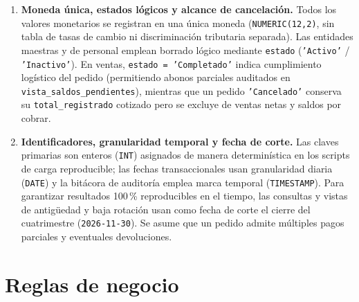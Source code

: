 \documentclass[11pt,oneside]{article}
\begin{document}
\begin{enumerate}[leftmargin=1.5em, itemsep=4pt]
  \item \textbf{Moneda \'unica, estados l\'ogicos y alcance de cancelaci\'on.}
        Todos los valores monetarios se registran en una \'unica moneda
        (\texttt{NUMERIC(12,2)}, sin tabla de tasas de cambio ni discriminaci\'on
        tributaria separada). Las entidades maestras y de personal emplean
        borrado l\'ogico mediante \texttt{estado} (\texttt{'Activo'} /
        \texttt{'Inactivo'}). En ventas, \texttt{estado = 'Completado'} indica
        cumplimiento log\'istico del pedido (permitiendo abonos parciales
        auditados en \texttt{vista\_saldos\_pendientes}), mientras que un
        pedido \texttt{'Cancelado'} conserva su \texttt{total\_registrado}
        cotizado pero se excluye de ventas netas y saldos por cobrar.

  \item \textbf{Identificadores, granularidad temporal y fecha de corte.}
        Las claves primarias son enteros (\texttt{INT}) asignados de manera
        determin\'istica en los scripts de carga reproducible; las fechas
        transaccionales usan granularidad diaria (\texttt{DATE}) y la bit\'acora
        de auditor\'ia emplea marca temporal (\texttt{TIMESTAMP}). Para
        garantizar resultados 100\,\% reproducibles en el tiempo, las consultas
        y vistas de antig\"uedad y baja rotaci\'on usan como fecha de corte
        el cierre del cuatrimestre (\texttt{2026-11-30}). Se asume que un
        pedido admite m\'ultiples pagos parciales y eventuales devoluciones.
\end{enumerate}

\newpage
\section{Reglas de negocio}
\end{document}
